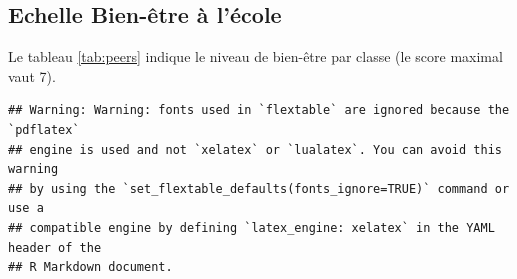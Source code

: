 \documentclass[
]{article}
\begin{document}
\hypertarget{echelle-bien-uxeatre-uxe0-luxe9cole}{%
\subsection{Echelle Bien-être à l'école}\label{echelle-bien-uxeatre-uxe0-luxe9cole}}

Le tableau \ref{tab:peers} indique le niveau de bien-être par classe (le score maximal vaut 7).

\begin{verbatim}
## Warning: Warning: fonts used in `flextable` are ignored because the `pdflatex`
## engine is used and not `xelatex` or `lualatex`. You can avoid this warning
## by using the `set_flextable_defaults(fonts_ignore=TRUE)` command or use a
## compatible engine by defining `latex_engine: xelatex` in the YAML header of the
## R Markdown document.
\end{verbatim}

\providecommand{\docline}[3]{\noalign{\global\setlength{\arrayrulewidth}{#1}}\arrayrulecolor[HTML]{#2}\cline{#3}}

\setlength{\tabcolsep}{8pt}

\renewcommand*{\arraystretch}{1.5}
\end{document}
